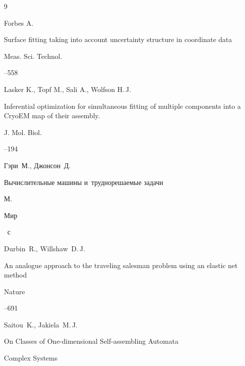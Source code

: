 \begin{thebibliography}{9}


\by Forbes A.

\paper Surface fitting taking into account uncertainty structure in coordinate data


\jour Meas. Sci. Technol.


--558




\by Lasker K., Topf M., Sali A., Wolfson H.\,J.

\paper Inferential optimization for simultaneous fitting of multiple components into a CryoEM map of their assembly.

\jour J. Mol. Biol.




--194




\by Гэри~М., Джонсон~Д.

\book Вычислительные машины и~труднорешаемые задачи

\publaddr М.

\publ Мир


~с




\by Durbin~R., Willshaw~D.\,J.

\paper An analogue approach to the traveling salesman problem using an elastic net method

\jour Nature



--691




\by Saitou~K., Jakiela~M.\,J.

\paper On Classes of One-dimensional Self-assembling Automata

\jour Complex Systems




\end{thebibliography}
